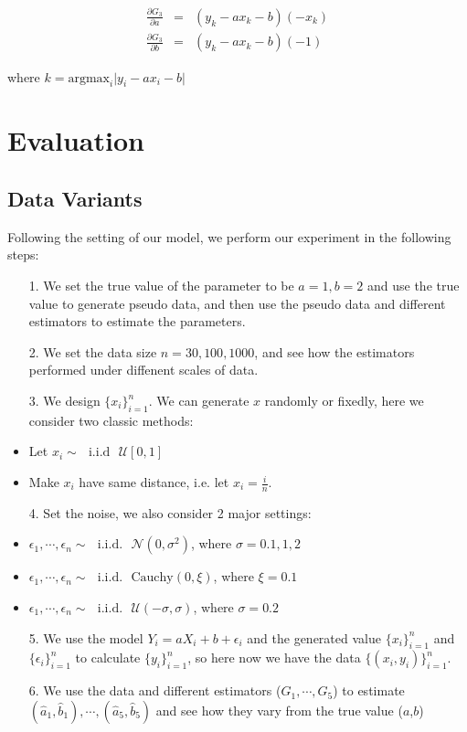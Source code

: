 \documentclass[twoside]{article}
\begin{document}
\begin{eqnarray}
  \frac{\partial G_3}{\partial a}&=&(y_k-a x_k - b)(-x_k) \\
  \frac{\partial G_3}{\partial b}&=&(y_k-a x_k - b)(-1) 
\end{eqnarray}

where $k = \mathrm{argmax}_i \lvert y_i - a x_i - b\rvert$

\section{Evaluation}

\subsection{Data Variants}

\label{process}

Following the setting of our model, we perform our experiment in the following steps:

\begin{itemize}
  \item[1.] We set the true value of the parameter to be $a=1, b=2$ and use the true value to generate pseudo data, and then use the pseudo data and different estimators to estimate the parameters.
  \item[2.] We set the data size $n=30, 100, 1000$, and see how the estimators performed under diffenent scales of data.
  \item[3.] We design $\{x_i\}_{i=1}^n$. We can generate $x$ randomly or fixedly, here we consider two classic methods:
        \item Let $x_i \sim\text{ }\mathrm{i.i.d}\textbf{ }\mathcal{U}[0, 1]$
        \item Make $x_i$ have same distance, i.e. let $x_i = \frac{i}{n}$.
  \item[4.] Set the noise, we also consider 2 major settings:
        \item $\epsilon_1, \cdots, \epsilon_n \sim\text{ }\mathrm{i.i.d.} \text{ }\mathcal{N}(0,\sigma^2)$, where $\sigma=0.1,1,2$
        \item $\epsilon_1, \cdots, \epsilon_n \sim\text{ }\mathrm{i.i.d.} \text{ }\mathrm{Cauchy}(0,\xi)$, where $\xi=0.1$
        \item $\epsilon_1, \cdots, \epsilon_n \sim\text{ }\mathrm{i.i.d.} \text{ }\mathcal{U}(-\sigma,\sigma)$, where $\sigma=0.2$
  \item[5.] We use the model $Y_i=a X_i + b + \epsilon_i$ and the generated value $\{x_i\}_{i=1}^n$ and $\{\epsilon_i\}_{i=1}^n$ to calculate $\{y_i\}_{i=1}^n$, so here now we have the data $\{(x_i,y_i)\}_{i=1}^n$.
  \item[6.] We use the data and different estimators ($G_1,\cdots,G_5$) to estimate $(\hat{a}_1,\hat{b}_1),\cdots,(\hat{a}_5,\hat{b}_5)$ and see how they vary from the true value ($a$,$b$)
\end{itemize}
\end{document}
